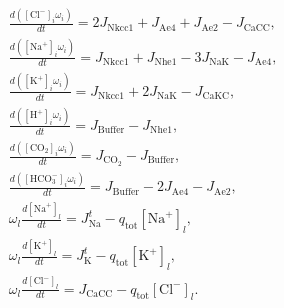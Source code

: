 \documentclass{svjour3}
\begin{document}
\begin{align*}
&\frac{d([\text{Cl}^-]_i \omega_i)}{dt}=2J_{\text{Nkcc1}}+J_{\text{Ae4}}+J_{\text{Ae2}}-J_{\text{CaCC}}, \\
&\frac{d([\text{Na}^+]_i \omega_i)}{dt}=J_{\text{Nkcc1}}+J_{\text{Nhe1}}-3J_{\text{NaK}}-J_{\text{Ae4}}, \\
&\frac{d([\text{K}^+]_i\omega_i)}{dt}=J_{\text{Nkcc1}}+2J_{\text{NaK}}-J_{\text{CaKC}},\\
&\frac{d([\text{H}^+]_i \omega_i)}{dt}=J_{\text{Buffer}}-J_{\text{Nhe1}}, \\
&\frac{d([\text{CO}_2]_i \omega_i)}{dt}=J_{\text{CO}_2}-J_{\text{Buffer}}, \\
&\frac{d([\text{HCO}_3^-]_i \omega_i)}{dt}= J_{\text{Buffer}}-2J_{\text{Ae4}}-J_{\text{Ae2}},\\
& \omega_l \frac{d[\text{Na}^+]_l}{dt}=J_{\text{Na}}^t-q_{\text{tot}}[\text{Na}^+]_l,\\
& \omega_l \frac{d[\text{K}^+]_l}{dt}=J_{\text{K}}^t-q_{\text{tot}}[\text{K}^+]_l, \\
&\omega_l \frac{d[\text{Cl}^-]_l}{dt}=J_{\text{CaCC}}-q_{\text{tot}}[\text{Cl}^-]_l.
\label{equations}
\end{align*}

\end{document}
